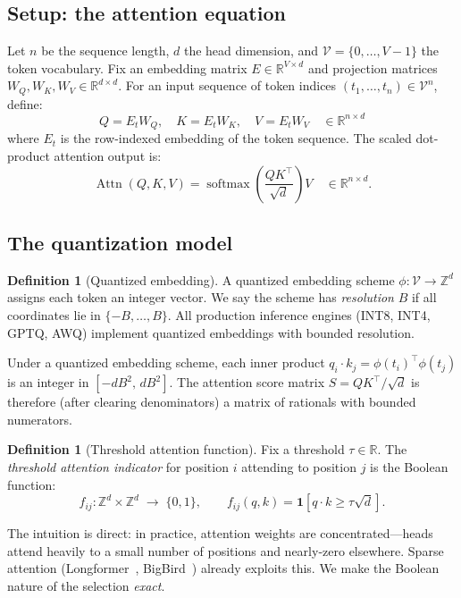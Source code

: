 \documentclass[11pt]{article}
\theoremstyle{definition}
\newtheorem{definition}[theorem]{Definition}
\newcommand{\RR}{\mathbb{R}}
\newcommand{\ZZ}{\mathbb{Z}}
\newcommand{\softmax}{\operatorname{softmax}}
\newcommand{\attn}{\operatorname{Attn}}
\begin{document}
\subsection{Setup: the attention equation}

Let $n$ be the sequence length, $d$ the head dimension, and
$\mathcal{V} = \{0, \ldots, V{-}1\}$ the token vocabulary.
Fix an embedding matrix $E \in \RR^{V \times d}$ and projection matrices
$W_Q, W_K, W_V \in \RR^{d \times d}$.
For an input sequence of token indices $(t_1, \ldots, t_n) \in \mathcal{V}^n$,
define:
\[
  Q = E_t W_Q, \quad K = E_t W_K, \quad V = E_t W_V
  \quad \in \RR^{n \times d}
\]
where $E_t$ is the row-indexed embedding of the token sequence.
The scaled dot-product attention output is:
\[
  \attn(Q, K, V) = \softmax\!\left(\frac{QK^\top}{\sqrt{d}}\right) V
  \quad \in \RR^{n \times d}.
\]

\subsection{The quantization model}

\begin{definition}[Quantized embedding]
A quantized embedding scheme $\phi : \mathcal{V} \to \ZZ^d$ assigns each
token an integer vector. We say the scheme has \emph{resolution} $B$ if
all coordinates lie in $\{-B, \ldots, B\}$.
All production inference engines (INT8, INT4, GPTQ, AWQ) implement quantized
embeddings with bounded resolution.
\end{definition}

Under a quantized embedding scheme, each inner product
$q_i \cdot k_j = \phi(t_i)^\top \phi(t_j)$ is an integer in
$[-d B^2, \, d B^2]$.
The attention score matrix $S = QK^\top / \sqrt{d}$ is therefore
(after clearing denominators) a matrix of rationals with bounded numerators.

\begin{definition}[Threshold attention function]
Fix a threshold $\tau \in \RR$. The \emph{threshold attention indicator}
for position $i$ attending to position $j$ is the Boolean function:
\[
  f_{ij} : \ZZ^d \times \ZZ^d \;\to\; \{0, 1\},
  \qquad
  f_{ij}(q, k) = \mathbf{1}[q \cdot k \geq \tau \sqrt{d}].
\]
\end{definition}

The intuition is direct: in practice, attention weights are concentrated—heads
attend heavily to a small number of positions and nearly-zero elsewhere.
Sparse attention (Longformer~\cite{beltagy2020}, BigBird~\cite{zaheer2020})
already exploits this. We make the Boolean nature of the selection \emph{exact}.
\end{document}
